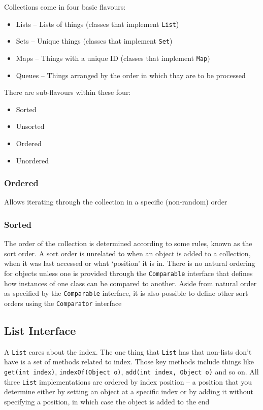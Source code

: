 Collections come in four basic flavours:
\begin{itemize}
    \item Lists -- Lists of things (classes that implement \verb#List#)
    \item Sets -- Unique things (classes that implement \verb#Set#)
    \item Maps -- Things with a unique ID (classes that implement \verb#Map#)
    \item Queues -- Things arranged by the order in which thay are to be 
    processed
\end{itemize}
There are sub-flavours within these four:
\begin{itemize}
    \item Sorted
    \item Unsorted
    \item Ordered
    \item Unordered
\end{itemize}

\subsubsection{Ordered}
Allows iterating through the collection in a specific (non-random) order

\subsubsection{Sorted}
The order of the collection is determined according to some rules, known as the 
sort order. A sort order is unrelated to when an object is added to a 
collection, when it was last accessed or what `position' it is in. There is no 
natural ordering for objects unless one is provided through the 
\verb#Comparable# interface that defines how instances of one class can be 
compared to another. Aside from natural order as specified by the 
\verb#Comparable# interface, it is also possible to define other sort orders 
using the \verb#Comparator# interface

\subsection{List Interface}
A \verb#List# cares about the index. The one thing that \verb#List# has that 
non-lists don't have is a set of methods related to index. Those key methods 
include things like \verb#get(int index)#, \verb#indexOf(Object o)#, 
\verb#add(int index, Object o)# and so on. All three \verb#List# 
implementations are ordered by index position -- a position that you determine 
either by setting an object at a specific index or by adding it without 
specifying a position, in which case the object is added to the end

